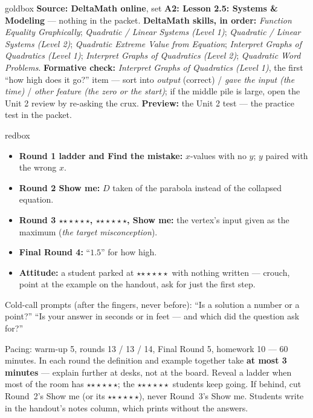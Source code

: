 \documentclass[10pt]{article}
\newcommand{\rung}[1]{{\color{goldacc}\ifcase#1\or$\star$\or$\star\star$\or$\star\star\star$\fi}}
\begin{document}
\boxguard
\begin{skillbox}{goldbox}
\textbf{Source: DeltaMath online}, set \textbf{A2: Lesson 2.5: Systems \& Modeling} --- nothing in the
packet. \textbf{DeltaMath skills, in order:} \emph{Function Equality Graphically}; \emph{Quadratic /
Linear Systems (Level 1)}; \emph{Quadratic / Linear Systems (Level 2)}; \emph{Quadratic Extreme
Value from Equation}; \emph{Interpret Graphs of Quadratics (Level 1)}; \emph{Interpret Graphs of
Quadratics (Level 2)}; \emph{Quadratic Word Problems}.
\textbf{Formative check:} \emph{Interpret Graphs of Quadratics (Level 1)}, the first ``how high
does it go?'' item --- sort into \emph{output} (correct) / \emph{gave the input (the time)} /
\emph{other feature (the zero or the start)}; if the middle pile is large, open the Unit 2 review
by re-asking the crux. \textbf{Preview:} the Unit 2 test --- the practice test in the packet.
\end{skillbox}

\boxguard
\begin{skillbox}{redbox}
\begin{itemize}[leftmargin=1.2em, nosep]
  \item \textbf{Round 1 ladder and Find the mistake:} $x$-values with no $y$; $y$ paired with
        the wrong $x$.
  \item \textbf{Round 2 Show me:} $D$ taken of the parabola instead of the collapsed equation.
  \item \textbf{Round 3 \rung2, \rung3, Show me:} the vertex's input given as the maximum
        (\emph{the target misconception}).
  \item \textbf{Final Round 4:} ``$1.5$'' for how high.
  \item \textbf{Attitude:} a student parked at \rung1\ with nothing written --- crouch, point at
        the example on the handout, ask for just the first step.
\end{itemize}
Cold-call prompts (after the fingers, never before): ``Is a solution a number or a point?'' \;
``Is your answer in seconds or in feet --- and which did the question ask for?''
\end{skillbox}

\begin{teachernote}[Slides]
Pacing: warm-up 5, rounds 13 / 13 / 14, Final Round 5, homework 10 --- 60 minutes. In each round
the definition and example together take \textbf{at most 3 minutes} --- explain further at
desks, not at the board. Reveal a ladder when most of the room has \rung2; the \rung3\ students
keep going. If behind, cut Round~2's Show me (or its \rung3), never Round~3's Show me. Students
write in the handout's notes column, which prints without the answers.
\end{teachernote}
\end{document}

